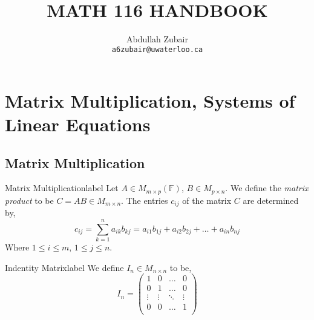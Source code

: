\documentclass[12pt]{article}
\title{ \normalsize \textsc{}   %
      \\[2.0cm]               %
      \HRule{0.5pt} \\            %
      \LARGE \textbf{\uppercase{Math 116 Handbook}} %
      \HRule{2pt} \\ [0.5cm]    %
      \normalsize     %
    }
\author{
    Abdullah Zubair\\
        \texttt{a6zubair@uwaterloo.ca} \\
}
\theoremstyle{definition}
\newcommand{\F}{\ensuremath{\mathbb{F}}}
\begin{document}
\setcounter{section}{2}
\section{Matrix Multiplication, Systems of Linear Equations}
\subsection{Matrix Multiplication}

\begin{definition}{Matrix Multiplication}{label}
   Let $A \in M_{m \times p}(\F)$, $B \in M_{p \times n}$. We define the \emph{matrix product} to be $C = AB \in M_{m\times n}$. The entries $c_{ij}$ of the matrix $C$ are determined by,
   $$c_{ij} = \sum_{k = 1}^n a_{ik}b_{kj} = a_{i1}b_{1j} + a_{i2}b_{2j} + \dots + a_{in}b_{nj}$$
   Where $1 \leq i \leq m$, $1 \leq j \leq n$. 
\end{definition}
\begin{definition}{Indentity Matrix}{label}
    We define $I_n \in M_{n \times n}$ to be,
    $$ I_n = \begin{pmatrix}
       1 & 0 & \dots & 0 \\ 
       0 & 1 & \dots & 0 \\ 
       \vdots & \vdots & \ddots & \vdots \\ 
       0 & 0 & \dots & 1 \\ 
    \end{pmatrix}$$
\end{definition}
\end{document}
